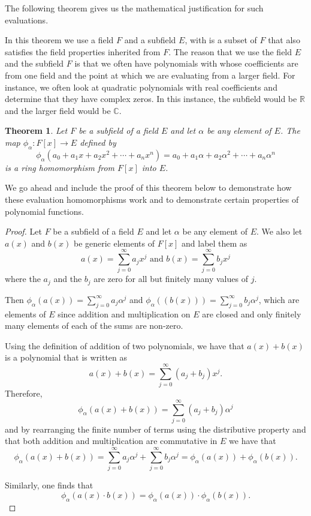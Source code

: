 \documentclass[
]{book}
\newtheorem{theorem}{Theorem}[chapter]
\theoremstyle{definition}
\theoremstyle{definition}
\theoremstyle{definition}
\theoremstyle{remark}
\begin{document}
The following theorem gives us the mathematical justification for such evaluations.

In this theorem we use a field \(F\) and a subfield \(E\), with is a subset of \(F\) that also satisfies the field properties inherited from \(F\). The reason that we use the field \(E\) and the subfield \(F\) is that we often have polynomials with whose coefficients are from one field and the point at which we are evaluating from a larger field. For instance, we often look at quadratic polynomials with real coefficients and determine that they have complex zeros. In this instance, the subfield would be \(\mathbb{R}\) and the larger field would be \(\mathbb{C}\).

\begin{theorem}
\protect\hypertarget{thm:unnamed-chunk-189}{}{\label{thm:unnamed-chunk-189} }Let \(F\) be a subfield of a field \(E\) and let \(\alpha\) be any element of \(E\). The map \(\phi_\alpha: F[x] \rightarrow E\) defined by \[\phi_\alpha(a_0 + a_1 x + a_2 x^2 + \cdots + a_n x^n) = a_0 + a_1 \alpha + a_2 \alpha^2 + \cdots + a_n \alpha^n\] is a ring homomorphism from \(F[x]\) into \(E\).
\end{theorem}

We go ahead and include the proof of this theorem below to demonstrate how these evaluation homomorphisms work and to demonstrate certain properties of polynomial functions.

\begin{proof}
{}Let \(F\) be a subfield of a field \(E\) and let \(\alpha\) be any element of \(E\). We also let \(a(x)\) and \(b(x)\) be generic elements of \(F[x]\) and label them as
\[a(x) = \sum_{j=0}^\infty a_j x^j \mbox{ and } b(x)=\sum_{j=0}^\infty b_j x^j\] where the \(a_j\) and the \(b_j\) are zero for all but finitely many values of \(j\).

Then \(\phi_\alpha \left(a(x)\right) = \sum_{j=0}^\infty a_j \alpha^j\) and \(\phi_\alpha\left(\left(b(x)\right)\right) = \sum_{j=0}^\infty b_j \alpha^j\), which are elements of \(E\) since addition and multiplication on \(E\) are closed and only finitely many elements of each of the sums are non-zero.

Using the definition of addition of two polynomials, we have that \(a(x)+b(x)\) is a polynomial that is written as \[a(x)+b(x) = \sum_{j=0}^\infty (a_j+b_j) x^j.\]
Therefore,
\[\phi_\alpha \left(a(x)+b(x)\right) = \sum_{j=0}^\infty (a_j+b_j) \alpha^j\] and by rearranging the finite number of terms using the distributive property and that both addition and multiplication are commutative in \(E\) we have that
\[\phi_\alpha \left(a(x)+b(x)\right) = \sum_{j=0}^\infty a_j \alpha^j + \sum_{j=0}^\infty b_j \alpha^j = \phi_\alpha \left(a(x)\right) + \phi_\alpha \left(b(x)\right). \]

Similarly, one finds that
\[\phi_\alpha \left(a(x) \cdot b(x)\right) = \phi_\alpha (a(x)) \cdot \phi_\alpha(b(x)).\]
\end{proof}
\end{document}
